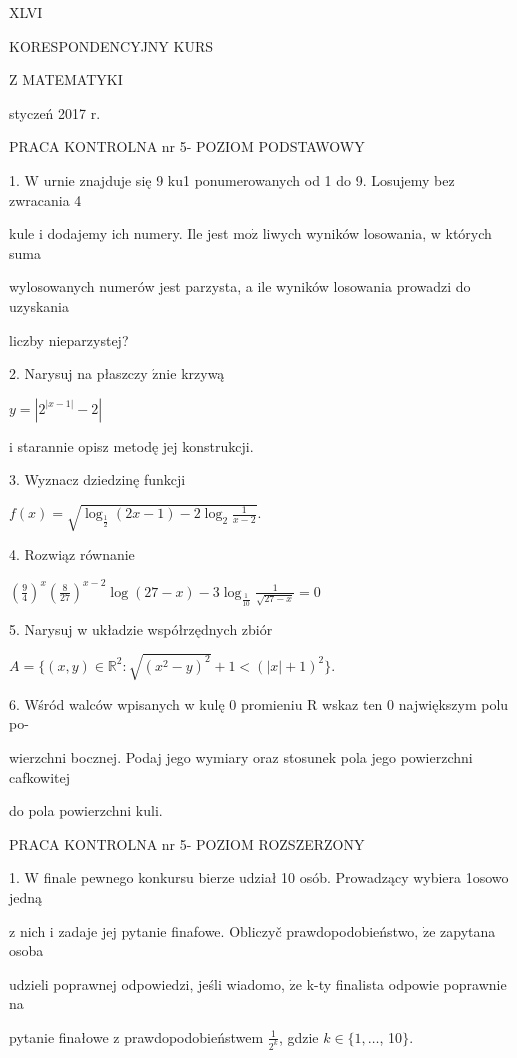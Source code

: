 \documentclass[a4paper,12pt]{article}
\begin{document}
XLVI

KORESPONDENCYJNY KURS

Z MATEMATYKI

styczeń 2017 r.

PRACA KONTROLNA nr 5- POZIOM PODSTAWOWY

1. $\mathrm{W}$ urnie znajduje się 9 ku1 ponumerowanych od 1 do 9. Losujemy bez zwracania 4

kule $\mathrm{i}$ dodajemy ich numery. Ile jest $\mathrm{m}\mathrm{o}\dot{\mathrm{z}}$ liwych wyników losowania, $\mathrm{w}$ których suma

wylosowanych numerów jest parzysta, a ile wyników losowania prowadzi do uzyskania

liczby nieparzystej?

2. Narysuj na płaszczy $\acute{\mathrm{z}}\mathrm{n}\mathrm{i}\mathrm{e}$ krzywą

$y=|2^{|x-1|}-2|$

i starannie opisz metodę jej konstrukcji.

3. Wyznacz dziedzinę funkcji

$f(x)=\sqrt{\log_{\frac{1}{2}}(2x-1)-2\log_{2}\frac{1}{x-2}}.$

4. Rozwiąz równanie

$(\displaystyle \frac{9}{4})^{x}(\frac{8}{27})^{x-2}\log(27-x)-3\log_{\frac{1}{10}}\frac{1}{\sqrt{27-x}}=0$

5. Narysuj w układzie współrzędnych zbiór

$A=\{(x,y)\in \mathbb{R}^{2}:\sqrt{(x^{2}-y)^{2}}+1<(|x|+1)^{2}\}.$

6. Wśród walców wpisanych w kulę 0 promieniu R wskaz ten 0 największym polu po-

wierzchni bocznej. Podaj jego wymiary oraz stosunek pola jego powierzchni cafkowitej

do pola powierzchni kuli.




PRACA KONTROLNA nr 5- POZIOM ROZSZERZONY

1. $\mathrm{W}$ finale pewnego konkursu bierze udział 10 osób. Prowadzący wybiera 1osowo jedną

$\mathrm{z}$ nich $\mathrm{i}$ zadaje jej pytanie finafowe. Obliczyč prawdopodobieństwo, $\dot{\mathrm{z}}\mathrm{e}$ zapytana osoba

udzieli poprawnej odpowiedzi, jeśli wiadomo, $\dot{\mathrm{z}}\mathrm{e}$ k-ty finalista odpowie poprawnie na

pytanie finałowe $\mathrm{z}$ prawdopodobieństwem $\displaystyle \frac{1}{2^{k}}$, gdzie $k\in\{1, \ldots$, 10$\}.$
\end{document}
